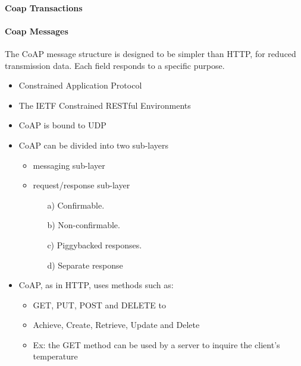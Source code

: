 \paragraph{Coap Transactions}

\paragraph{Coap Messages}
The CoAP message structure is designed to be simpler than HTTP,
	for reduced transmission data.
Each field responds to a specific purpose.



\begin{itemize}
	\item Constrained Application Protocol
	\item The IETF Constrained RESTful Environments
	\item CoAP is bound to UDP
	\item CoAP can be divided into two sub-layers
		\begin{itemize}
			\item messaging sub-layer
			\item request/response sub-layer
			\begin{itemize}
				\item[a)] Confirmable. 
				\item[b)] Non-confirmable. 
				\item[c)] Piggybacked responses. 
				\item[d)] Separate response
			\end{itemize}
		\end{itemize}
	\item CoAP, as in HTTP, uses methods such as:
	\begin{itemize}
		\item GET, PUT, POST and DELETE to 
		\item Achieve, Create, Retrieve, Update and Delete
	\end{itemize}
	\begin{itemize}
		\item Ex: the GET method can be used by a server to inquire the client’s temperature
	\end{itemize}
\end{itemize}

